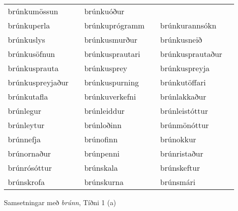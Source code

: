 \documentclass[../samsetningasafn.tex]{subfiles}
\begin{document}
\begin{wordlist}[H]
\begin{tcolorbox}
\begin{tabular}{BlBlBl}
		brúnkumössun	&		& 
		brúnkuóður		&		\\  %
		brúnkuperla		&		& 
		brúnkuprógramm	&		& 
		brúnkurannsókn	&		\\  %
		brúnkuslys		&		& 
		brúnkusmurður	&		& 
		brúnkusneið		&		\\  %
		brúnkusöfnun	&		& 
		brúnkusprautari	&		& 
		brúnkusprautaður &		\\  %
		brúnkusprauta	&		& 
		brúnkusprey		&		& 
		brúnkuspreyja	&		\\  %
		brúnkuspreyjaður &		& 
		brúnkuspurning	&		& 
		brúnkutöffari		&		\\  %
		brúnkutafla		&		& 
		brúnkuverkefni	&		& 
		brúnlakkaður		&		\\  %
		brúnlegur		&		& 
		brúnleiddur		&		& 
		brúnleistóttur	&		\\  %
		brúnleytur		&		& 
		brúnloðinn		&		& 
		brúnmönóttur	&		\\  %
		brúnnefja		&		& 
		brúnofinn		&		& 
		brúnokkur		&		\\  %
		brúnornaður		&		& 
		brúnpenni		&		& 
		brúnristaður		&		\\  %
		brúnrósóttur		&		& 
		brúnskala		&		& 
		brúnskeftur		&		\\  %
		brúnskrofa		&		& 
		brúnskurna		&		& 
		brúnsmári		&			 %
	\end{tabular}

\end{tcolorbox}
	\caption{Samsetningar með \textit{brúnn}, Tíðni 1 (a)}
	\label{listi:brunt.1a}
\end{wordlist}		
		
\end{document}
